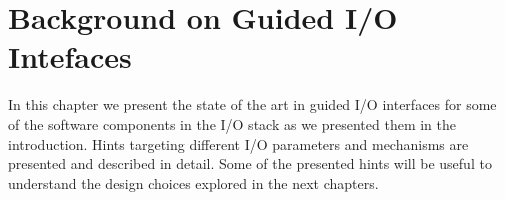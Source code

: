 \chapter{Background on Guided I/O Intefaces}
\label{chapter: guided-io}
In this chapter we present the state of the art in guided I/O interfaces for some of the software components in the I/O stack as we presented them in the introduction. Hints targeting different I/O parameters and mechanisms are presented and described in detail. Some of the presented hints will be useful to understand the design choices explored in the next chapters.




